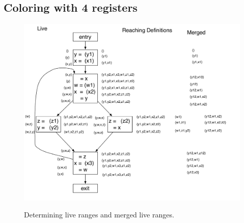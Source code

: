 \subsection{Coloring with 4 registers}

\begin{figure}[!htbp]
    \centering
    \caption{Determining live ranges and merged live ranges.}
    \includegraphics[scale=0.50]{register_allocation1.pdf}
    \label{fig:regalloc1}
\end{figure}

\clearpage

